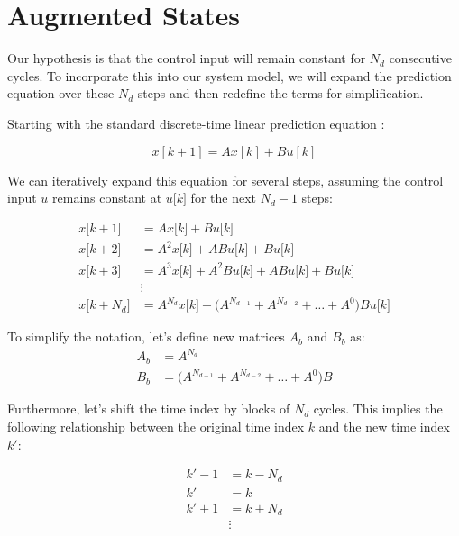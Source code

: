 \section{Augmented States}
\label{section_augmented_states}

Our hypothesis is that the control input will remain constant for $N_d$ consecutive cycles. To 
incorporate this into our system model, we will expand the prediction equation over these $N_d$ 
steps and then redefine the terms for simplification.

Starting with the standard discrete-time linear prediction equation :

\noindent
\begin{equation}
    x[k + 1] = A x[k] + B u[k] \nonumber
\end{equation}

We can iteratively expand this equation for several steps, assuming the control 
input $u$ remains constant at $u\big[k\big]$ for the next $N_d - 1$ steps:

\noindent
\begin{align}
    x\big[k+1\big] &= A x\big[k\big] + B u\big[k\big] \nonumber \\
    x\big[k+2\big] &= A^2 x\big[k\big] + AB u\big[k\big] + B u\big[k\big] \nonumber \\
    x\big[k+3\big] &= A^3 x\big[k\big] + A^2B u\big[k\big]+ AB u\big[k\big] + B u\big[k\big] \nonumber \\
    &\vdots \nonumber \\
    x\big[k+N_d\big] &= A^{N_d} x\big[k\big] + \big(A^{N_{d-1}} + A^{N_{d-2}} + \dots +  A^0 \big)Bu\big[k\big]
\end{align}

To simplify the notation, let's define new matrices $A_b$ and $B_b$ as:
\noindent
\begin{align}
    A_b &= A^{N_d} \\
    B_b &= \big(A^{N_{d-1}} + A^{N_{d-2}} + \dots +  A^0 \big)B
\end{align}

Furthermore, let's shift the time index by blocks of $N_d$ cycles. This implies the following relationship between 
the original time index $k$ and the new time index $k'$:

\noindent
\begin{align*}
    k' - 1 &= k - N_d \\
    k' &= k \\
    k' + 1 &= k + N_d \\
    &\vdots
\end{align*}

